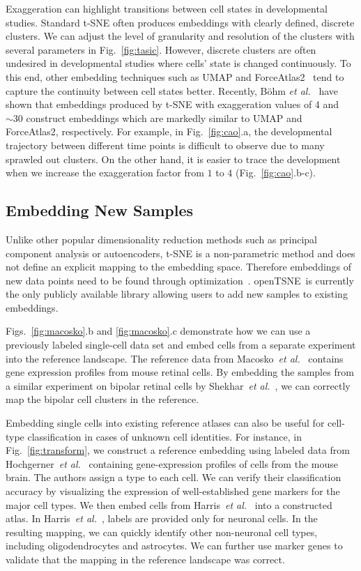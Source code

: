 \documentclass[twocolumn]{bmcart}
\newcommand{\opentsne}{\textsf{openTSNE}}
\begin{document}
Exaggeration can highlight transitions between cell states in developmental studies. Standard t-SNE often produces embeddings with clearly defined, discrete clusters. We can adjust the level of granularity and resolution of the clusters with several parameters in Fig.~\ref{fig:tasic}. However, discrete clusters are often undesired in developmental studies where cells' state is changed continuously. To this end, other embedding techniques such as UMAP and ForceAtlas2~\cite{jacomy2014forceatlas2} tend to capture the continuity between cell states better. Recently, B{\"o}hm \textit{et al.}~\cite{bohm2020unifying} have shown that embeddings produced by t-SNE with exaggeration values of 4 and $\sim30$ construct embeddings which are markedly similar to UMAP and ForceAtlas2, respectively. For example, in Fig.~\ref{fig:cao}.a, the developmental trajectory between different time points is difficult to observe due to many sprawled out clusters. On the other hand, it is easier to trace the development when we increase the exaggeration factor from $1$ to $4$ (Fig.~\ref{fig:cao}.b-c).

\subsection*{Embedding New Samples}

Unlike other popular dimensionality reduction methods such as principal
component analysis or autoencoders, t-SNE is a non-parametric method and does not define an explicit mapping to the embedding space. Therefore embeddings of new data points need to be found through optimization~\cite{policar2019embedding}. \opentsne\ is currently the only publicly available library allowing users to add new samples to existing embeddings.

Figs.~\ref{fig:macosko}.b and \ref{fig:macosko}.c demonstrate how we can use a previously labeled single-cell data set and embed cells from a separate experiment into the reference landscape. The reference data from Macosko~\textit{et al.}~\cite{macosko2015highly} contains gene expression profiles from mouse retinal cells. By embedding the samples from a similar experiment on bipolar retinal cells by Shekhar~\textit{et al.}~\cite{shekhar2016comprehensive}, we can correctly map the bipolar cell clusters in the reference.

Embedding single cells into existing reference atlases can also be useful for cell-type classification in cases of unknown cell identities. For instance, in Fig.~\ref{fig:transform}, we construct a reference embedding using labeled data from Hochgerner~\textit{et al.}~\cite{hochgerner2018conserved} containing gene-expression profiles of cells from the mouse brain. The authors assign a type to each cell. We can verify their classification accuracy by visualizing the expression of well-established gene markers for the major cell types. We then embed cells from Harris~\textit{et al.}~\cite{harris2018classes} into a constructed atlas. In Harris~\textit{et al.}~, labels are provided only for neuronal cells. In the resulting mapping, we can quickly identify other non-neuronal cell types, including oligodendrocytes and astrocytes. We can further use marker genes to validate that the mapping in the reference landscape was correct. 
\end{document}
